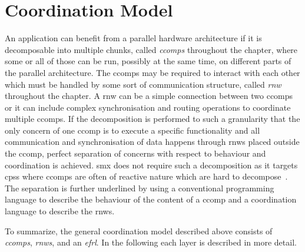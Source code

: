 

\section{Coordination Model}
\label{sect_smx_model}
An application can benefit from a parallel hardware architecture if it is decomposable into multiple chunks, called \emph{\glspl*{ccomp}} throughout the chapter, where some or all of those can be run, possibly at the same time, on different parts of the parallel architecture.
The \glspl*{ccomp} may be required to interact with each other which must be handled by some sort of communication structure, called \emph{\gls*{rnw}} throughout the chapter.
A \gls*{rnw} can be a simple connection between two \glspl*{ccomp} or it can include complex synchronisation and routing operations to coordinate multiple \glspl*{ccomp}.
If the decomposition is performed to such a granularity that the only concern of one \gls*{ccomp} is to execute a specific functionality and all communication and synchronisation of data happens through \glspl*{rnw} placed outside the \gls*{ccomp}, perfect separation of concerns with respect to behaviour and coordination is achieved.
\Gls*{smx} does not require such a decomposition as it targets \glspl{cps} where \glspl*{ccomp} are often of reactive nature which are hard to decompose~\cite{harel1985}.
The separation is further underlined by using a conventional programming language to describe the behaviour of the content of a \gls*{ccomp} and a coordination language to describe the \glspl*{rnw}.

To summarize, the general coordination model described above consists of \emph{\glspl*{ccomp}}, \emph{\glspl*{rnw}}, and an \emph{\gls*{efrl}}.
In the following each layer is described in more detail.

